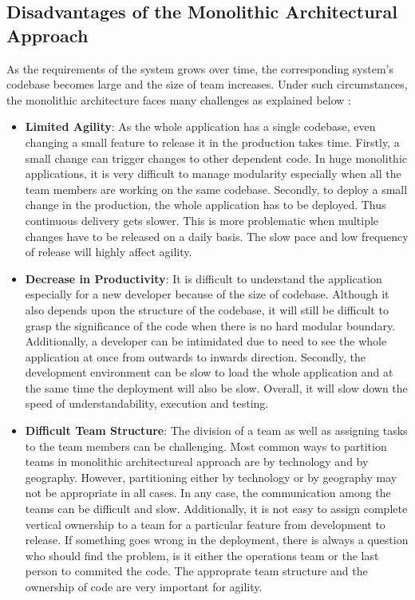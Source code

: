 \subsection{Disadvantages of the Monolithic Architectural Approach}\label{subsection:context/monolith-disadvantages}
As the requirements of the system grows over time, the corresponding system's codebase becomes large and the size of team increases. Under such circumstances, the monolithic architecture faces many challenges as explained below \cite{Namiot:2014aa} \cite{Newman:2015aa}\cite{Abram:2014aa} \cite{Richardson:2014aa} \cite{Richardson:2014ab} \cite{Gupta:2015aa} :
\begin{itemize}[leftmargin=.5in]
\item \textbf{Limited Agility}: As the whole application has a single codebase, even changing a small feature to release it in the production takes time. Firstly, a small change can trigger changes to other dependent code. In huge monolithic applications, it is very difficult to manage modularity especially when all the team members are working on the same codebase. Secondly, to deploy a small change in the production, the whole application has to be deployed. Thus continuous delivery gets slower. This is more problematic when multiple changes have to be released on a daily basis. The slow pace and low frequency of release will highly affect agility.
\\
\item \textbf{Decrease in Productivity}: It is difficult to understand the application especially for a new developer because of the size of codebase. Although it also depends upon the structure of the codebase, it will still be difficult to grasp the significance of the code when there is no hard modular boundary. Additionally, a developer can be intimidated due to need to see the whole application at once from outwards to inwards direction. Secondly, the development environment can be slow to load the whole application and at the same time the deployment will also be slow. Overall, it will slow down the speed of understandability, execution and testing.
\\
\item \textbf{Difficult Team Structure}: The division of a team as well as assigning tasks to the team members can be challenging. Most common ways to partition teams in monolithic architectureal approach are by technology and by geography. However, partitioning either by technology or by geography may not be appropriate in all cases. In any case, the communication among the teams can be difficult and slow. Additionally, it is not easy to assign complete vertical ownership to a team for a particular feature from development to release. If something goes wrong in the deployment, there is always a question who should find the problem, is it either the operations team or the last person to commited the code. The approprate team structure and the ownership of code are very important for agility.

\end{itemize}
